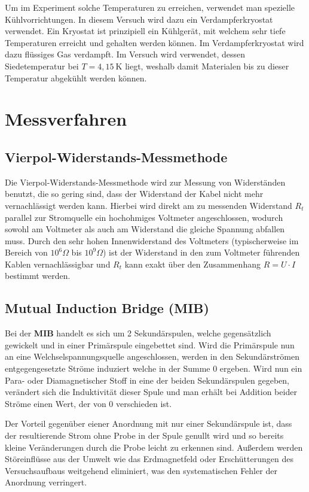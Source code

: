 \documentclass[bigchapter,colorback,accentcolor=tud4b,linedtoc,11pt]{tudreport}
\numberwithin{equation}{subsection}
\begin{document}
Um im Experiment solche Temperaturen zu erreichen, verwendet man spezielle Kühlvorrichtungen. In diesem Versuch wird dazu ein Verdampferkryostat verwendet. Ein Kryostat ist prinzipiell ein Kühlgerät, mit welchem sehr tiefe Temperaturen erreicht und gehalten werden können. Im Verdampferkryostat wird dazu flüssiges Gas verdampft. Im Versuch wird  verwendet, dessen Siedetemperatur bei \(T = 4,15 \ \mathrm{K}\) liegt, weshalb damit Materialen bis zu dieser Temperatur abgekühlt werden können.

\section{Messverfahren}
\subsection{Vierpol-Widerstands-Messmethode}
Die Vierpol-Widerstands-Messmethode wird zur Messung von Widerständen benutzt, die so gering sind, dass der Widerstand der Kabel nicht mehr vernachlässigt werden kann. Hierbei wird direkt am zu messenden Widerstand $R_t$ parallel zur Stromquelle ein hochohmiges Voltmeter angeschlossen, wodurch sowohl am Voltmeter als auch am Widerstand die gleiche Spannung abfallen muss. Durch den sehr hohen Innenwiderstand des Voltmeters (typischerweise im Bereich von $10^6\Omega$ bis $10^9\Omega$) ist der Widerstand in den zum Voltmeter führenden Kablen vernachlässigbar und $R_t$ kann exakt über den Zusammenhang $R=U \cdot I$ bestimmt werden.
\subsection{Mutual Induction Bridge (\textbf{MIB})}
Bei der \textbf{MIB} handelt es sich um 2 Sekundärspulen, welche gegensätzlich gewickelt und in einer Primärspule eingebettet sind. Wird die Primärspule nun an eine Welchselspannungsquelle angeschlossen, werden in den Sekundärströmen entgegengesetzte Ströme induziert welche in der Summe 0 ergeben. Wird nun ein Para- oder Diamagnetischer Stoff in eine der beiden Sekundärspulen gegeben, verändert sich die Induktivität dieser Spule und man erhält bei Addition beider Ströme einen Wert, der von 0 verschieden ist.

Der Vorteil gegenüber eiener Anordnung mit nur einer Sekundärspule ist, dass der resultierende Strom ohne Probe in der Spule genullt wird und so bereits kleine Veränderungen durch die Probe leicht zu erkennen sind. Außerdem werden Störeinflüsse aus der Umwelt wie das Erdmagnetfeld oder Erschütterungen des Versuchsaufbaus weitgehend eliminiert, was den systematischen Fehler der Anordnung verringert.
\end{document}
